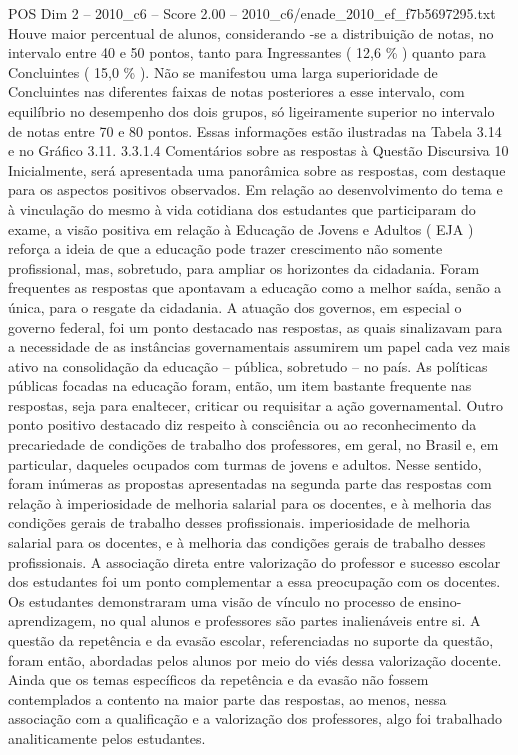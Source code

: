 \begin{textsample}{POS Dim 2 – 2010\_c6 – Score 2.00 – 2010\_c6/enade\_2010\_ef\_f7b5697295.txt}
Houve maior percentual de alunos, considerando -se a distribuição de notas, no intervalo entre 40 e 50 pontos, tanto para Ingressantes ( 12,6 \% ) quanto para Concluintes ( 15,0 \% ).
Não se manifestou uma larga superioridade de Concluintes nas diferentes faixas de notas posteriores a esse intervalo, com equilíbrio no desempenho dos dois grupos, só ligeiramente superior no intervalo de notas entre 70 e 80 pontos.
Essas informações estão ilustradas na Tabela 3.14 e no Gráfico 3.11. 3.3.1.4 Comentários sobre as respostas à Questão Discursiva 10 Inicialmente, será apresentada uma panorâmica sobre as respostas, com destaque para os aspectos positivos observados.
Em relação ao desenvolvimento do tema e à vinculação do mesmo à vida cotidiana dos estudantes que participaram do exame, a visão positiva em relação à Educação de Jovens e Adultos ( EJA ) reforça a ideia de que a educação pode trazer crescimento não somente profissional, mas, sobretudo, para ampliar os horizontes da cidadania.
Foram frequentes as respostas que apontavam a educação como a melhor saída, senão a única, para o resgate da cidadania.
A atuação dos governos, em especial o governo federal, foi um ponto destacado nas respostas, as quais sinalizavam para a necessidade de as instâncias governamentais assumirem um papel cada vez mais ativo na consolidação da educação – pública, sobretudo – no país.
As políticas públicas focadas na educação foram, então, um item bastante frequente nas respostas, seja para enaltecer, criticar ou requisitar a ação governamental.
Outro ponto positivo destacado diz respeito à consciência ou ao reconhecimento da precariedade de condições de trabalho dos professores, em geral, no Brasil e, em particular, daqueles ocupados com turmas de jovens e adultos.
Nesse sentido, foram inúmeras as propostas apresentadas na segunda parte das respostas com relação à imperiosidade de melhoria salarial para os docentes, e à melhoria das condições gerais de trabalho desses profissionais. imperiosidade de melhoria salarial para os docentes, e à melhoria das condições gerais de trabalho desses profissionais.
A associação direta entre valorização do professor e sucesso escolar dos estudantes foi um ponto complementar a essa preocupação com os docentes.
Os estudantes demonstraram uma visão de vínculo no processo de ensino-aprendizagem, no qual alunos e professores são partes inalienáveis entre si.
A questão da repetência e da evasão escolar, referenciadas no suporte da questão, foram então, abordadas pelos alunos por meio do viés dessa valorização docente.
Ainda que os temas específicos da repetência e da evasão não fossem contemplados a contento na maior parte das respostas, ao menos, nessa associação com a qualificação e a valorização dos professores, algo foi trabalhado analiticamente pelos estudantes.

\end{textsample}
